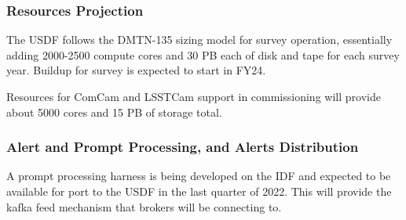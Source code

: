 \subsubsection{Resources Projection}

The USDF follows the DMTN-135 sizing model for survey operation,
essentially adding 2000-2500 compute cores and 30 PB each of disk and
tape for each survey year. Buildup for survey is expected to start in FY24.

Resources for ComCam and LSSTCam support in commissioning will provide
about 5000 cores and 15 PB of storage total.

\subsubsection{Alert and Prompt Processing, and Alerts Distribution}

A prompt processing harness is being developed on the IDF and expected to be
available for port to the USDF in the last quarter of 2022. This will
provide the kafka feed mechanism that brokers will be connecting to.
